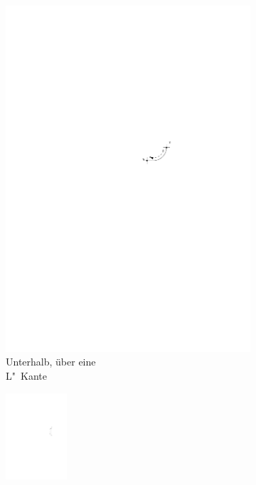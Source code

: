 \documentclass[a4paper]{scrreprt}
\theoremstyle{definition}
\begin{document}
\begin{figure}[h]
\begin{subfigure}[b]{0.2\textwidth}
                \includegraphics[width=\textwidth]{schnitt_finden/bot_aboveL}
                \caption{Unterhalb, über eine \\ L"~Kante}
                \label{fig:cutfinding_bot_aboveL}
        \end{subfigure}
        \quad
        \begin{subfigure}[b]{0.2\textwidth}
                \includegraphics[width=0.25\textwidth]{schnitt_finden/bot_vertical}

\end{subfigure}
\end{figure}
\end{document}
